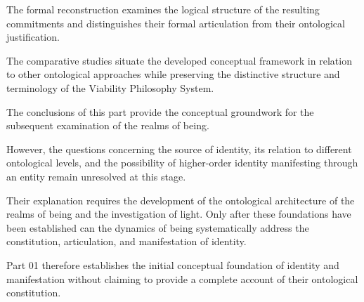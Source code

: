 The formal reconstruction examines the logical
structure of the resulting commitments and
distinguishes their formal articulation from
their ontological justification.

The comparative studies situate the developed
conceptual framework in relation to other
ontological approaches while preserving the
distinctive structure and terminology of the
Viability Philosophy System.

The conclusions of this part provide the
conceptual groundwork for the subsequent
examination of the realms of being.

However, the questions concerning the source
of identity, its relation to different
ontological levels, and the possibility of
higher-order identity manifesting through
an entity remain unresolved at this stage.

Their explanation requires the development
of the ontological architecture of the realms
of being and the investigation of light.
Only after these foundations have been
established can the dynamics of being
systematically address the constitution,
articulation, and manifestation of identity.

Part 01 therefore establishes the initial
conceptual foundation of identity and
manifestation without claiming to provide
a complete account of their ontological
constitution.


